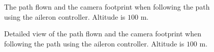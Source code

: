 \begin{figure}[]
    \centering
    \caption{The path flown and the camera footprint when following the path using the aileron controller. Altitude is $100$ m.}
	\label{fig:aotc_path_hundred}
\end{figure}

\begin{figure}[]
    \centering
    \caption{Detailed view of the path flown and the camera footprint when following the path using the aileron controller. Altitude is $100$ m.}
	\label{fig:aotc_comp_hundred}
\end{figure}

